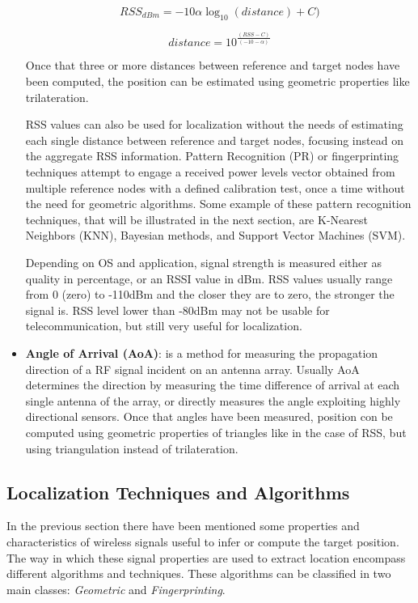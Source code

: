 \begin{itemize}
\begin{equation}\label{eq:RSS_dist}
RSS_{dBm} = -10 \alpha \log_{10}(distance) + C)
\end{equation}

\begin{equation}\label{eq:dist_RSS}
distance = 10^{\frac{(RSS - C)}{(-10 - \alpha)}}
\end{equation}

Once that three or more distances between reference and target nodes have been computed, the position can be estimated using geometric properties like trilateration.

RSS values can also be used for localization without the needs of estimating each single distance between reference and target nodes, focusing instead on the aggregate RSS information. Pattern Recognition (PR) or fingerprinting techniques attempt to engage a received power levels vector obtained from multiple reference nodes with a defined calibration test, once a time without the need for geometric algorithms. Some example of these pattern recognition techniques, that will be illustrated in the next section, are K-Nearest Neighbors (KNN), Bayesian methods, and Support Vector Machines (SVM).

Depending on OS and application, signal strength is measured either as quality in percentage, or an RSSI value in dBm. RSS values usually range from 0 (zero) to -110dBm and the closer they are to zero, the stronger the signal is. RSS level lower than -80dBm may not be usable for telecommunication, but still very useful for localization.

\item \textbf{Angle of Arrival (AoA)}: is a method for measuring the propagation direction of a RF signal incident on an antenna array. Usually AoA determines the direction by measuring the time difference of arrival at each single antenna of the array, or directly measures the angle exploiting highly directional sensors. Once that angles have been measured, position con be computed using geometric properties of triangles like in the case of RSS, but using triangulation instead of trilateration.

\end{itemize}

\subsection{Localization Techniques and Algorithms}
\label{subsec:loc_algorithms}
In the previous section there have been mentioned some properties and characteristics of wireless signals useful to infer or compute the target position. The way in which these signal properties are used to extract location encompass different algorithms and techniques. These algorithms can be classified in two main classes: \emph{Geometric} and \emph{Fingerprinting}.

